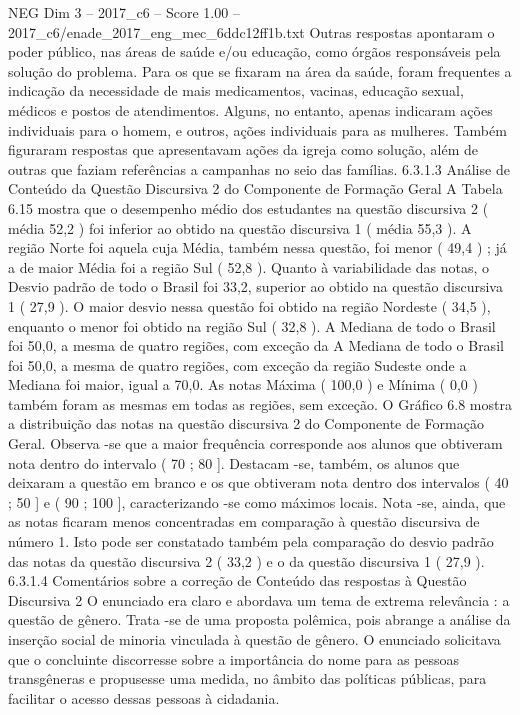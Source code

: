 \begin{textsample}{NEG Dim 3 – 2017\_c6 – Score 1.00 – 2017\_c6/enade\_2017\_eng\_mec\_6ddc12ff1b.txt}
Outras respostas apontaram o poder público, nas áreas de saúde e/ou educação, como órgãos responsáveis pela solução do problema.
Para os que se fixaram na área da saúde, foram frequentes a indicação da necessidade de mais medicamentos, vacinas, educação sexual, médicos e postos de atendimentos.
Alguns, no entanto, apenas indicaram ações individuais para o homem, e outros, ações individuais para as mulheres.
Também figuraram respostas que apresentavam ações da igreja como solução, além de outras que faziam referências a campanhas no seio das famílias. 6.3.1.3 Análise de Conteúdo da Questão Discursiva 2 do Componente de Formação Geral A Tabela 6.15 mostra que o desempenho médio dos estudantes na questão discursiva 2 ( média 52,2 ) foi inferior ao obtido na questão discursiva 1 ( média 55,3 ).
A região Norte foi aquela cuja Média, também nessa questão, foi menor ( 49,4 ) ; já a de maior Média foi a região Sul ( 52,8 ).
Quanto à variabilidade das notas, o Desvio padrão de todo o Brasil foi 33,2, superior ao obtido na questão discursiva 1 ( 27,9 ).
O maior desvio nessa questão foi obtido na região Nordeste ( 34,5 ), enquanto o menor foi obtido na região Sul ( 32,8 ).
A Mediana de todo o Brasil foi 50,0, a mesma de quatro regiões, com exceção da A Mediana de todo o Brasil foi 50,0, a mesma de quatro regiões, com exceção da região Sudeste onde a Mediana foi maior, igual a 70,0.
As notas Máxima ( 100,0 ) e Mínima ( 0,0 ) também foram as mesmas em todas as regiões, sem exceção.
O Gráfico 6.8 mostra a distribuição das notas na questão discursiva 2 do Componente de Formação Geral.
Observa -se que a maior frequência corresponde aos alunos que obtiveram nota dentro do intervalo ( 70 ; 80 ].
Destacam -se, também, os alunos que deixaram a questão em branco e os que obtiveram nota dentro dos intervalos ( 40 ; 50 ] e ( 90 ; 100 ], caracterizando -se como máximos locais.
Nota -se, ainda, que as notas ficaram menos concentradas em comparação à questão discursiva de número 1.
Isto pode ser constatado também pela comparação do desvio padrão das notas da questão discursiva 2 ( 33,2 ) e o da questão discursiva 1 ( 27,9 ). 6.3.1.4 Comentários sobre a correção de Conteúdo das respostas à Questão Discursiva 2 O enunciado era claro e abordava um tema de extrema relevância : a questão de gênero.
Trata -se de uma proposta polêmica, pois abrange a análise da inserção social de minoria vinculada à questão de gênero.
O enunciado solicitava que o concluinte discorresse sobre a importância do nome para as pessoas transgêneras e propusesse uma medida, no âmbito das políticas públicas, para facilitar o acesso dessas pessoas à cidadania.

\end{textsample}
